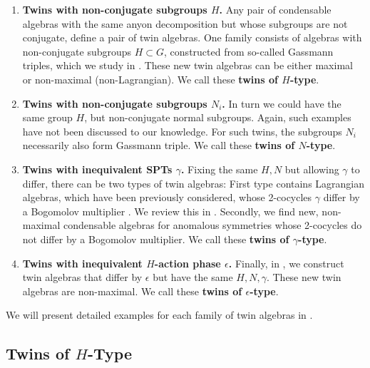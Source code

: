 \documentclass[aps,twocolumn,prx,floatfix,preprintnumbers, nofootinbib,10pt]{revtex4-2}
\numberwithin{equation}{section}
\theoremstyle{definition}
\begin{document}
\begin{enumerate}
\item  {\bf Twins with non-conjugate subgroups $H$.} Any pair of condensable algebras with the same anyon decomposition but whose subgroups are not conjugate, define a pair of twin algebras. One family consists of algebras with non-conjugate subgroups $H\subset G$, constructed from so-called Gassmann triples, which we study in . These new twin algebras can be either maximal or non-maximal (non-Lagrangian).  We call these {\bf twins of $H$-type}.

\item {\bf Twins with non-conjugate subgroups $N_i$.}
In turn we could have the same group $H$, but non-conjugate normal subgroups. Again, such examples have not been discussed to our knowledge. {For such twins, the subgroups $N_i$ necessarily also form Gassmann triple.} 
 We call these {\bf twins of $N$-type}.

\item {\bf Twins with inequivalent SPTs $\gamma$.}
Fixing the same $H, N$ but allowing $\gamma$ to differ, there can be two types of twin algebras: First type contains Lagrangian algebras, which have been previously considered, whose 2-cocycles $\gamma$ differ by a Bogomolov multiplier \cite{Pollmann:2012,Davydov:2013xov, Cong:2017ffh, Kobayashi:2025ykb,Kobayashi:2025pxs}. We review this in . 
Secondly, we find new, non-maximal condensable algebras for anomalous symmetries whose 2-cocycles do not differ by a Bogomolov multiplier. We call these {\bf twins of $\gamma$-type}.

\item {\bf Twins with inequivalent $H$-action phase $\epsilon$.}
Finally, in , we construct twin algebras that differ by $\epsilon$ but have the same $H,N,\gamma$. These new twin algebras are non-maximal. We call these {\bf twins of $\epsilon$-type}.
\end{enumerate}


We will present detailed examples for each family of twin algebras in .






\subsection{Twins of $H$-Type}
\label{sec:Gassmann_Triple_twin_alg}
\end{document}
